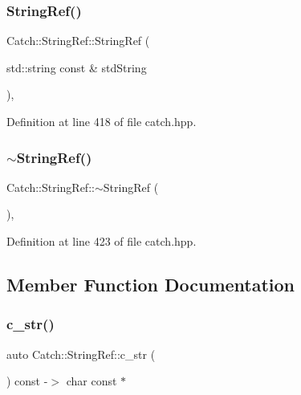 \subsubsection{\texorpdfstring{String\+Ref()}{StringRef()}\hspace{0.1cm}{\footnotesize\ttfamily [6/6]}}
{\footnotesize\ttfamily Catch\+::\+String\+Ref\+::\+String\+Ref (\begin{DoxyParamCaption}\item[{std\+::string const \&}]{std\+String }\end{DoxyParamCaption})\hspace{0.3cm}{\ttfamily [inline]}, {\ttfamily [noexcept]}}



Definition at line 418 of file catch.\+hpp.

\mbox{\label{class_catch_1_1_string_ref_a387795c6d883d7281befe5e82920faf8}} 
\subsubsection{\texorpdfstring{$\sim$\+String\+Ref()}{~StringRef()}}
{\footnotesize\ttfamily Catch\+::\+String\+Ref\+::$\sim$\+String\+Ref (\begin{DoxyParamCaption}{ }\end{DoxyParamCaption})\hspace{0.3cm}{\ttfamily [inline]}, {\ttfamily [noexcept]}}



Definition at line 423 of file catch.\+hpp.



\subsection{Member Function Documentation}
\mbox{\label{class_catch_1_1_string_ref_a1669cb2765e820ca258159676cbd82a5}} 
\subsubsection{\texorpdfstring{c\+\_\+str()}{c\_str()}}
{\footnotesize\ttfamily auto Catch\+::\+String\+Ref\+::c\+\_\+str (\begin{DoxyParamCaption}{ }\end{DoxyParamCaption}) const -\/$>$  char const $\ast$}

